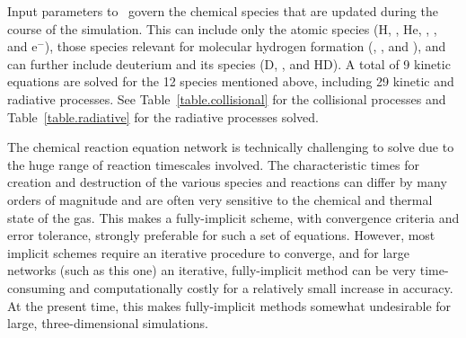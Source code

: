Input parameters to \enzo\ govern the chemical species that are updated during
the course of the simulation.  This can include only the atomic species (H,
\Hp, He, \Hep, \Hepp, and e$^-$), those species relevant for molecular hydrogen
formation (\HH, \HHp, and \Hm), and can further include deuterium and its
species (D, \Dp, and HD).  A total of 9 kinetic equations are solved for the
12 species mentioned above, including
29 kinetic and radiative processes.  See
Table~\ref{table.collisional} for the collisional processes and
Table~\ref{table.radiative} for the radiative processes solved.

The chemical reaction equation network is technically challenging to solve due
to the huge range of reaction timescales involved.  The characteristic times
for creation and destruction of the various species and reactions can differ by
many orders of magnitude and are often very sensitive to the chemical and
thermal state of the gas.  This makes a fully-implicit scheme, with convergence
criteria and error tolerance, strongly preferable for such a set of equations.
However, most implicit schemes require an iterative procedure to converge, and
for large networks (such as this one) an iterative, fully-implicit method can
be very time-consuming and computationally costly for a relatively small
increase in accuracy.  At the present time, this makes fully-implicit methods
somewhat undesirable for large, three-dimensional simulations.

